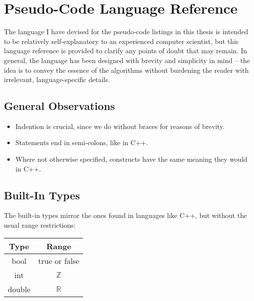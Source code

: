 \chapter{Pseudo-Code Language Reference}

The language I have devised for the pseudo-code listings in this thesis is intended to be relatively self-explanatory to an experienced computer scientist, but this language reference is provided to clarify any points of doubt that may remain. In general, the language has been designed with brevity and simplicity in mind -- the idea is to convey the essence of the algorithms without burdening the reader with irrelevant, language-specific details.

\section{General Observations}

\begin{itemize}
\item Indention is crucial, since we do without braces for reasons of brevity.
\item Statements end in semi-colons, like in C++.
\item Where not otherwise specified, constructs have the same meaning they would in C++.
\end{itemize}

\section{Built-In Types}

The built-in types mirror the ones found in languages like C++, but without the usual range restrictions:

\begin{center}
\begin{tabular}{c|c}
\textbf{Type} & \textbf{Range} \\
\hline
bool & true or false \\
int & $\mathbb{Z}$ \\
double & $\mathbb{R}$
\end{tabular}
\end{center}

